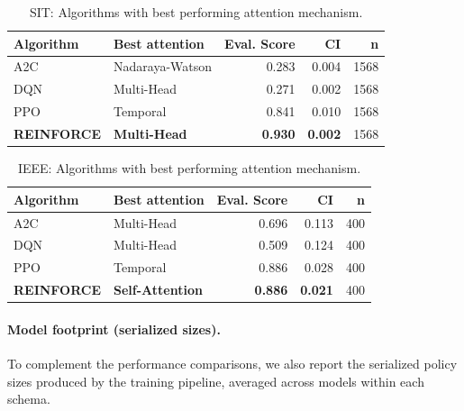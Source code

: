 \documentclass[sn-basic]{sn-jnl} %
\begin{document}
\begin{table}
	\caption{SIT: Algorithms with best performing attention mechanism.}
	\label{tab:sit_best_attn}
	\begin{tabular}{l l r r r}
	\toprule
	\textbf{Algorithm} & \textbf{Best attention} & \textbf{Eval. Score} & \textbf{CI} & \textbf{n}\\
	\midrule
		A2C & Nadaraya-Watson & 0.283 & 0.004 & 1568 \\
		DQN & Multi-Head & 0.271 & 0.002 & 1568 \\
		PPO & Temporal & 0.841 & 0.010 & 1568 \\
		\textbf{REINFORCE} & \textbf{Multi-Head} & \textbf{0.930} & \textbf{0.002} & 1568 \\
	\bottomrule
	\end{tabular}
\end{table}

\begin{table}[t]
	\centering
	\caption{IEEE: Algorithms with best performing attention mechanism.}
	\label{tab:ieee_best_attn}
	\begin{tabular}{l l r r r}
	\toprule
	\textbf{Algorithm} & \textbf{Best attention} & \textbf{Eval. Score} & \textbf{CI} & \textbf{n}\\
	\midrule
		A2C & Multi-Head & 0.696 & 0.113 & 400 \\
		DQN & Multi-Head & 0.509 & 0.124 & 400 \\
		PPO & Temporal & 0.886 & 0.028 & 400 \\
		\textbf{REINFORCE} & \textbf{Self-Attention} & \textbf{0.886} & \textbf{0.021} & 400 \\
	\bottomrule
	\end{tabular}
\end{table}

\paragraph{Model footprint (serialized sizes).}
To complement the performance comparisons, we also report the serialized policy sizes produced by the training pipeline, averaged across models within each schema.
\end{document}
